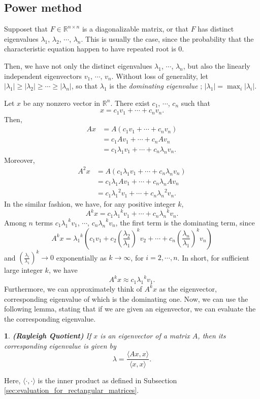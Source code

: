 \documentclass[12pt]{report}
\numberwithin{figure}{chapter}
\theoremstyle{plain}
\theoremstyle{definition}
\theoremstyle{corollary}
\theoremstyle{definition}
\theoremstyle{plain}
\theoremstyle{definition}
\theoremstyle{plain}
\newtheorem{lemma}[theorem]{\protect\lemmaname}
\providecommand{\lemmaname}{Lemma}
\begin{document}
\subsection{Power method}\label{sec:power_method}
Supposet that \(F\in\mathbb R^{n\times n}\) is a diagonalizable matrix, or that \(F\) has distinct eigenvalues \(\lambda_1\), \(\lambda_2\), \(\cdots\), \(\lambda_n\).
This is usually the case, since the probability that the characteristic equation happen to have repeated root is 0.

Then, we have not only the distinct eigenvalues \(\lambda_1\), \(\cdots\), \(\lambda_n\), but also the linearly independent eigenvectors \(v_1\), \(\cdots\), \(v_n\).
Without loss of generality, let \(|\lambda_1|\ge|\lambda_2|\ge\cdots\ge|\lambda_n|\), so that \(\lambda_1\) is the \emph{dominating eigenvalue} ; \(|\lambda_1|=\max_i|\lambda_i|\).

Let \(x\) be any nonzero vector in \(\mathbb R^n\).
There exist \(c_1\), \(\cdots\), \(c_n\) such that
\[x=c_1v_1+\cdots+c_nv_n.\]
Then,
\begin{align*}
Ax
&=A(c_1v_1+\cdots+c_nv_n)\\
&=c_1Av_1+\cdots+c_nAv_n\\
&=c_1\lambda_1v_1+\cdots+c_n\lambda_nv_n.
\end{align*}
Moreover,
\begin{align*}
A^2x
&=A(c_1\lambda_1v_1+\cdots+c_n\lambda_nv_n)\\
&=c_1\lambda_1Av_1+\cdots+c_n\lambda_nAv_n\\
&=c_1{\lambda_1}^2v_1+\cdots+c_n{\lambda_n}^2v_n.
\end{align*}
In the similar fashion, we have, for any positive integer \(k\),
\[A^kx=c_1{\lambda_1}^kv_1+\cdots+c_n{\lambda_n}^kv_n.\]
Among \(n\) terms \(c_1{\lambda_1}^kv_1\), \(\cdots\), \(c_n{\lambda_n}^kv_n\), the first term is the dominating term, since
\[A^kx={\lambda_1}^k\left(c_1v_1+c_2\left(\frac{\lambda_2}{\lambda_1}\right)^kv_2+\cdots+c_n\left(\frac{\lambda_n}{\lambda_1}\right)^kv_n\right)\]
and
\(\left(\frac{\lambda_i}{\lambda_1}\right)^k\to0\) exponentially as \(k\to\infty\), for \(i=2,\cdots,n\).
In short, for sufficient large integer \(k\), we have
\[A^kx\approx c_1{\lambda_1}^kv_1.\]
Furthermore, we can approximately think of \(A^kx\) as the eigenvector, corresponding eigenvalue of which is the dominating one.
Now, we can use the following lemma, stating that if we are given an eigenvector, we can evaluate the the corresponding eigenvalue.

\begin{lemma}\label{lemm:Rayleigh}
\textbf{(Rayleigh Quotient)}
If \(x\) is an eigenvector of a matrix \(A\), then its corresponding eigenvalue is given by
\[\lambda = \frac{\langle Ax,x\rangle}{\langle x,x\rangle}.\]
\end{lemma}
Here, \(\langle\cdot,\cdot\rangle\) is the inner product as defined in Subsection \ref{sec:evaluation_for_rectangular_matrices}.
\end{document}

